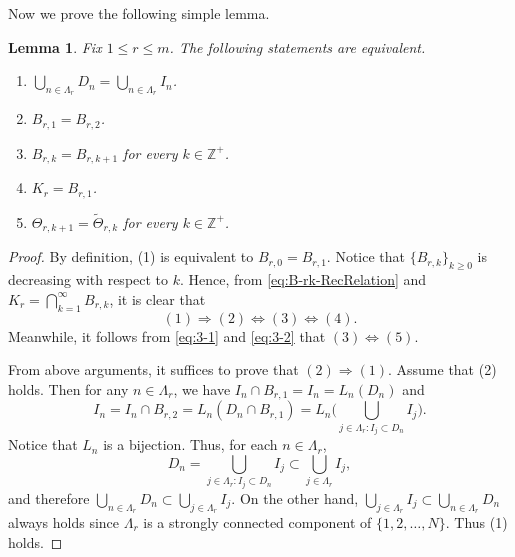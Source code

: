 \documentclass[11pt]{amsart}
\newtheorem{lem}[thm]{Lemma}
\theoremstyle{definition}
\theoremstyle{remark}
\numberwithin{equation}{section}
\newcommand{\mB}{{\mathcal B}}
\newcommand{\red}{\color{red}}
\def\wdt{\widetilde}
\begin{document}


Now we prove the following simple lemma.
\begin{lem}\label{lem:equivalent-cr}
	Fix $1 \leq r \leq m$. The following statements are equivalent.
	\begin{enumerate}
		\item $ \bigcup_{n \in \Lambda_r}D_n=\bigcup_{n \in \Lambda_r} I_n$.
		\item $B_{r,1}=B_{r,2}$.
		\item $B_{r,k}=B_{r,k+1}$  for every $k \in \mathbb{Z}^+$.
		\item $K_r=B_{r,1}$.
		\item $ \Theta_{r,k+1}=\wdt{\Theta}_{r,k}$ for every $k \in \mathbb{Z}^+$.
	\end{enumerate}
\end{lem}
\begin{proof}
	By definition, (1) is equivalent to $B_{r,0}=B_{r,1}$. Notice that $\{B_{r,k}\}_{k\geq 0}$ is decreasing with respect to $k$. Hence, from \eqref{eq:B-rk-RecRelation} and $K_r=\bigcap_{k=1}^\infty B_{r,k}$, it is clear that
	\[(1) \Rightarrow (2) \Leftrightarrow (3)\Leftrightarrow (4).\]
	Meanwhile, it follows from \eqref{eq:3-1} and \eqref{eq:3-2} that $(3)\Leftrightarrow (5)$.
	
	
	
	
	
	From above arguments, it suffices to prove that $(2) \Rightarrow (1)$. Assume that (2) holds. Then for any $n \in \Lambda_r$, 
	we have $I_n \cap B_{r,1}=I_n= L_n(D_n)$ and 
	\[
	I_n = I_n \cap B_{r,2}
	= L_n ( D_n\cap  B_{r,1}  ) 
	= L_n\Big( \bigcup_{j\in \Lambda_r: I_j\subset D_n} I_j  \Big).
	\]
	Notice that $L_n$ is a bijection.
	Thus, for each $n\in \Lambda_r$, 
	\[D_n=\bigcup_{j\in \Lambda_r: I_j\subset D_n} I_j\subset \bigcup_{j\in \Lambda_r} I_j,\] 
	and therefore $\bigcup_{n\in \Lambda_r} D_n\subset \bigcup_{j\in \Lambda_r} I_j $. On the other hand, $\bigcup_{j\in \Lambda_r} I_j\subset \bigcup_{n\in \Lambda_r} D_n$ always holds since $\Lambda_r$ is a strongly connected component of $\{1,2,\ldots,N\}$. Thus (1) holds.	
\end{proof}
\end{document}

